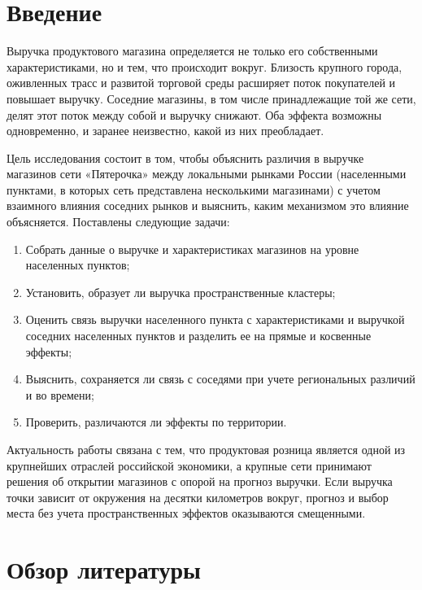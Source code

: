 \documentclass[12pt, a4paper]{article}
\begin{document}
\section*{Введение}

Выручка продуктового магазина определяется не только его собственными характеристиками, но и
тем, что происходит вокруг. Близость крупного города, оживленных трасс и развитой торговой среды
расширяет поток покупателей и повышает выручку. Соседние магазины, в том числе принадлежащие той
же сети, делят этот поток между собой и выручку снижают. Оба эффекта возможны одновременно, и
заранее неизвестно, какой из них преобладает.

Цель исследования состоит в том, чтобы объяснить различия в выручке магазинов сети «Пятерочка»
между локальными рынками России (населенными пунктами, в которых сеть представлена несколькими
магазинами) с учетом взаимного влияния соседних рынков и выяснить, каким механизмом это влияние
объясняется. Поставлены следующие задачи:

\begin{enumerate}
    \item Собрать данные о выручке и характеристиках магазинов на уровне населенных пунктов;
    \item Установить, образует ли выручка пространственные кластеры;
    \item Оценить связь выручки населенного пункта с характеристиками и выручкой соседних
    населенных пунктов и разделить ее на прямые и косвенные эффекты;
    \item Выяснить, сохраняется ли связь с соседями при учете региональных различий и во времени;
    \item Проверить, различаются ли эффекты по территории.
\end{enumerate}

Актуальность работы связана с тем, что продуктовая розница является одной из крупнейших отраслей
российской экономики, а крупные сети принимают решения об открытии магазинов с опорой на прогноз
выручки. Если выручка точки зависит от окружения на десятки километров вокруг, прогноз и выбор
места без учета пространственных эффектов оказываются смещенными.

\clearpage

\section*{Обзор литературы}
\end{document}
